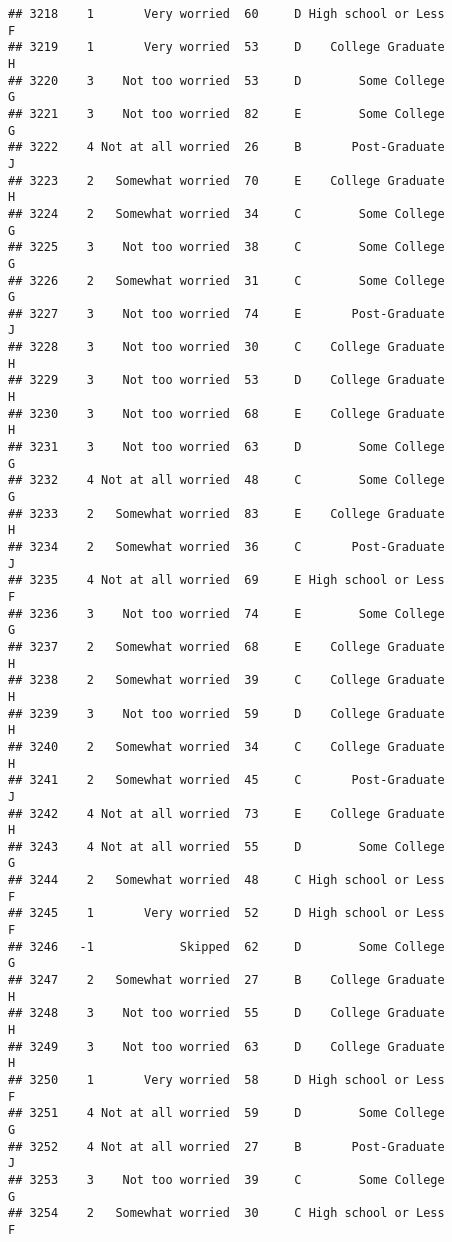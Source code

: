 \documentclass[
]{article}
\begin{document}
\begin{verbatim}
## 3218    1       Very worried  60     D High school or Less         F
## 3219    1       Very worried  53     D    College Graduate         H
## 3220    3    Not too worried  53     D        Some College         G
## 3221    3    Not too worried  82     E        Some College         G
## 3222    4 Not at all worried  26     B       Post-Graduate         J
## 3223    2   Somewhat worried  70     E    College Graduate         H
## 3224    2   Somewhat worried  34     C        Some College         G
## 3225    3    Not too worried  38     C        Some College         G
## 3226    2   Somewhat worried  31     C        Some College         G
## 3227    3    Not too worried  74     E       Post-Graduate         J
## 3228    3    Not too worried  30     C    College Graduate         H
## 3229    3    Not too worried  53     D    College Graduate         H
## 3230    3    Not too worried  68     E    College Graduate         H
## 3231    3    Not too worried  63     D        Some College         G
## 3232    4 Not at all worried  48     C        Some College         G
## 3233    2   Somewhat worried  83     E    College Graduate         H
## 3234    2   Somewhat worried  36     C       Post-Graduate         J
## 3235    4 Not at all worried  69     E High school or Less         F
## 3236    3    Not too worried  74     E        Some College         G
## 3237    2   Somewhat worried  68     E    College Graduate         H
## 3238    2   Somewhat worried  39     C    College Graduate         H
## 3239    3    Not too worried  59     D    College Graduate         H
## 3240    2   Somewhat worried  34     C    College Graduate         H
## 3241    2   Somewhat worried  45     C       Post-Graduate         J
## 3242    4 Not at all worried  73     E    College Graduate         H
## 3243    4 Not at all worried  55     D        Some College         G
## 3244    2   Somewhat worried  48     C High school or Less         F
## 3245    1       Very worried  52     D High school or Less         F
## 3246   -1            Skipped  62     D        Some College         G
## 3247    2   Somewhat worried  27     B    College Graduate         H
## 3248    3    Not too worried  55     D    College Graduate         H
## 3249    3    Not too worried  63     D    College Graduate         H
## 3250    1       Very worried  58     D High school or Less         F
## 3251    4 Not at all worried  59     D        Some College         G
## 3252    4 Not at all worried  27     B       Post-Graduate         J
## 3253    3    Not too worried  39     C        Some College         G
## 3254    2   Somewhat worried  30     C High school or Less         F

\end{verbatim}
\end{document}
